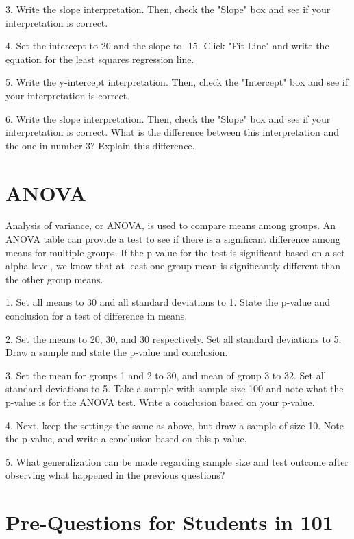 \documentclass[11pt]{amsart}
\begin{document}
3. Write the slope interpretation. Then, check the "Slope" box and see if your interpretation is correct.

4.   Set the intercept to 20 and the slope to -15. Click "Fit Line" and write the equation for the least squares regression line.

5. Write the y-intercept interpretation. Then, check the "Intercept" box and see if your interpretation is correct.

6. Write the slope interpretation. Then, check the "Slope" box and see if your interpretation is correct. What is the difference between this interpretation and the one in number 3? Explain this difference.



\section{ANOVA}
Analysis of variance, or ANOVA, is used to compare means among groups.  An ANOVA table can provide a test to see if there is a significant difference among means for multiple groups. If the p-value for the test is significant based on a set alpha level, we know that at least one group mean is significantly different than the other group means.

1. Set all means to 30 and all standard deviations to 1.  State the p-value and conclusion for a test of difference in means.

2.  Set the means to 20, 30, and 30 respectively.  Set all standard deviations to 5.  Draw a sample and state the p-value and conclusion.  

3. Set the mean for groups 1 and 2 to 30, and mean of group 3 to 32.  Set all standard deviations to 5.  Take a sample with sample size 100 and note what the p-value is for the ANOVA test.  Write a conclusion based on your p-value.

4. Next, keep the settings the same as above, but draw a sample of size 10.  Note the p-value, and write a conclusion based on this p-value.  

5.  What generalization can be made regarding sample size and test outcome  after observing what happened in the previous questions?

\newpage



\section{Pre-Questions for Students in 101}
\end{document}
